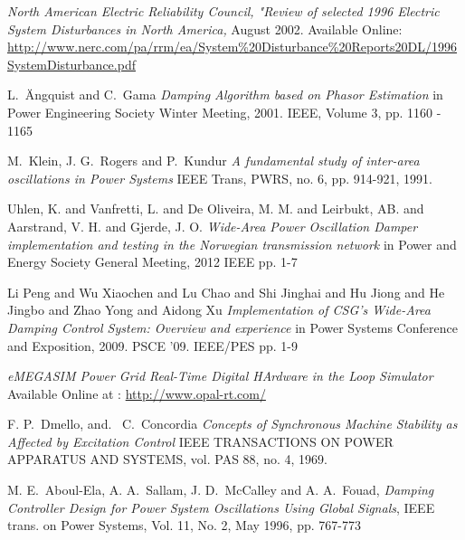 \documentclass[conference]{IEEEtran}
\begin{document}
%
%
%
\begin{thebibliography}{1}

 \emph{North American Electric Reliability Council, "Review of selected 1996 Electric System Disturbances in North America,} August 2002. Available Online:  \url{http://www.nerc.com/pa/rrm/ea/System%20Disturbance%20Reports20DL/1996SystemDisturbance.pdf}

L.~\"{A}ngquist and C.~Gama  \emph{Damping Algorithm based on Phasor Estimation} in Power Engineering Society Winter Meeting, 2001. IEEE, Volume 3, pp. 1160 - 1165  

M.~Klein, J. G.~Rogers and P.~Kundur \emph{A fundamental study of inter-area oscillations in Power Systems} IEEE Trans, PWRS, no. 6, pp. 914-921, 1991.

 Uhlen, K. and Vanfretti, L. and De Oliveira, M. M. and Leirbukt, AB. and Aarstrand, V. H. and Gjerde, J. O. \emph{Wide-Area Power Oscillation Damper implementation and testing in the Norwegian transmission network} in Power and Energy Society General Meeting, 2012 IEEE pp. 1-7

 Li Peng and Wu Xiaochen and Lu Chao and Shi Jinghai and Hu Jiong and He Jingbo and Zhao Yong and Aidong Xu \emph{Implementation of CSG's Wide-Area Damping Control System: Overview and experience} in Power Systems Conference and Exposition, 2009. PSCE '09. IEEE/PES pp. 1-9

 \emph{eMEGASIM Power Grid Real-Time Digital HArdware in the Loop Simulator} Available Online at : \url{http://www.opal-rt.com/}

 F. P.~Dmello, and. \ C.~Concordia
  \emph{Concepts of Synchronous Machine Stability as Affected by Excitation Control} IEEE TRANSACTIONS ON POWER APPARATUS AND SYSTEMS, vol. PAS 88, no. 4, 1969. 
  
  M. E.~Aboul-Ela, A. A.~Sallam, J. D.~McCalley and A. A.~Fouad, \emph{Damping Controller Design for Power System Oscillations Using Global Signals}, IEEE trans. on Power Systems, Vol. 11, No. 2, May 1996, pp. 767-773
  

\end{thebibliography}
\end{document}
